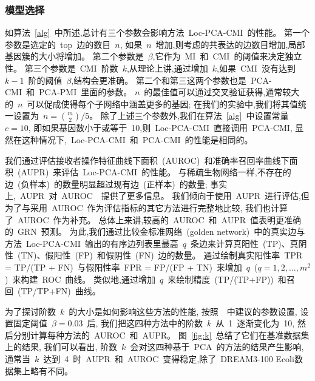 \subsubsection{模型选择}
如算法~\ref{alg}~中所述,总计有三个参数会影响方法~Loc-PCA-CMI~的性能。
第一个参数是选定的~top~边的数目~$n$,
如果~$n$~增加,则考虑的共表达的边数目增加,局部基因簇的大小将增加。
第二个参数是~$\beta$,它作为~MI~和~CMI~的阈值来决定独立性。
第三个参数是~CMI~阶数~$k$,从理论上讲,通过增加~$k$,如果~CMI~没有达到~$k-1$~阶的阈值~$\beta$,结构会更准确。
第二个和第三这两个参数也是~PCA-CMI~和~PCA-PMI~里面的参数。
$n$~的最佳值可以通过交叉验证获得,通常较大的~$n$~可以促成使得每个子网络中涵盖更多的基因;
在我们的实验中,我们将其值统一设置为~$n =\binom{m} {2}/5$。
除了上述三个参数外,我们在算法~\ref{alg}~中设置常量~$c = 10$,
即如果基因数小于或等于~10,则~Loc-PCA-CMI~直接调用~PCA-CMI,
显然在这种情况下,~Loc-PCA-CMI~和~PCA-CMI~的性能是相同的。

我们通过评估接收者操作特征曲线下面积~(AUROC)~和准确率召回率曲线下面积~(AUPR)~来评估~Loc-PCA-CMI~的性能。
与稀疏生物网络一样,不存在的边~(负样本)~的数量明显超过现有边~(正样本)~的数量; 
事实上,~AUPR~对~AUROC~\cite{saito2015precision}~提供了更多信息。
我们倾向于使用~AUPR~进行评估,但为了与采用~AUROC~作为评估指标的其它方法进行完整地比较,
我们也计算了~AUROC~作为补充。
总体上来讲,较高的~AUROC~和~AUPR~值表明更准确的~GRN~预测。
为此,我们通过比较金标准网络~(golden network)~中的真实边与
方法~Loc-PCA-CMI~输出的有序边列表里最高~$q$~条边来计算真阳性~(TP)、真阴性~(TN)、假阳性~(FP)~和假阴性~(FN)~边的数量。
通过绘制真实阳性率~TPR = TP/(TP + FN)~与假阳性率~FPR = FP/(FP + TN)~来增加~$q$~($q = 1, 2, \ldots, m^2$)~来构建~ROC~曲线。
类似地,通过增加~$q$~来绘制精度~(TP/(TP+FP))~和召回~(TP/TP+FN)~曲线。

为了探讨阶数~$k$~的大小是如何影响这些方法的性能,
按照~\cite{zhang2011inferring,zhao2016part}~中建议的参数设置,
设置固定阈值~$\beta = 0.03$~后,
我们把这四种方法中的阶数~$k$~从~1~逐渐变化为~10,
然后分别计算每种方法的~AUROC~和~AUPR。
图~\ref{fig:k}~总结了它们在基准数据集上的结果, 我们可以看出, 阶数~$k$~会对这四种基于~PCA~的方法的结果产生影响,通常当~$k$~达到~4~时~AUPR~和~AUROC~变得稳定,除了~DREAM3-100 Ecoli数据集上略有不同。

